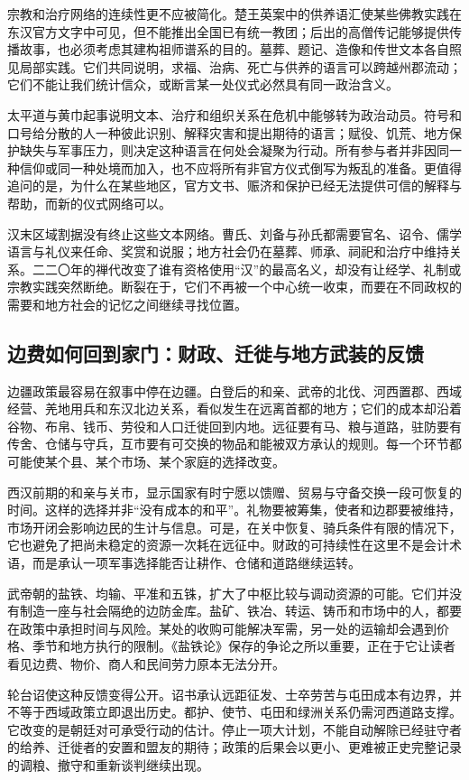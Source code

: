 宗教和治疗网络的连续性更不应被简化。楚王英案中的供养语汇使某些佛教实践在东汉官方文字中可见，但不能推出全国已有统一教团；后出的高僧传记能够提供传播故事，也必须考虑其建构祖师谱系的目的。墓葬、题记、造像和传世文本各自照见局部实践。它们共同说明，求福、治病、死亡与供养的语言可以跨越州郡流动；它们不能让我们统计信众，或断言某一处仪式必然具有同一政治含义。

太平道与黄巾起事说明文本、治疗和组织关系在危机中能够转为政治动员。符号和口号给分散的人一种彼此识别、解释灾害和提出期待的语言；赋役、饥荒、地方保护缺失与军事压力，则决定这种语言在何处会凝聚为行动。所有参与者并非因同一种信仰或同一种处境而加入，也不应将所有非官方仪式倒写为叛乱的准备。更值得追问的是，为什么在某些地区，官方文书、赈济和保护已经无法提供可信的解释与帮助，而新的仪式网络可以。

汉末区域割据没有终止这些文本网络。曹氏、刘备与孙氏都需要官名、诏令、儒学语言与礼仪来任命、奖赏和说服；地方社会仍在墓葬、师承、祠祀和治疗中维持关系。二二〇年的禅代改变了谁有资格使用“汉”的最高名义，却没有让经学、礼制或宗教实践突然断绝。断裂在于，它们不再被一个中心统一收束，而要在不同政权的需要和地方社会的记忆之间继续寻找位置。

\subsection{边费如何回到家门：财政、迁徙与地方武装的反馈}

边疆政策最容易在叙事中停在边疆。白登后的和亲、武帝的北伐、河西置郡、西域经营、羌地用兵和东汉北边关系，看似发生在远离首都的地方；它们的成本却沿着谷物、布帛、钱币、劳役和人口迁徙回到内地。远征要有马、粮与道路，驻防要有传舍、仓储与守兵，互市要有可交换的物品和能被双方承认的规则。每一个环节都可能使某个县、某个市场、某个家庭的选择改变。

西汉前期的和亲与关市，显示国家有时宁愿以馈赠、贸易与守备交换一段可恢复的时间。这样的选择并非“没有成本的和平”。礼物要被筹集，使者和边郡要被维持，市场开闭会影响边民的生计与信息。可是，在关中恢复、骑兵条件有限的情况下，它也避免了把尚未稳定的资源一次耗在远征中。财政的可持续性在这里不是会计术语，而是承认一项军事选择能否让耕作、仓储和道路继续运转。

武帝朝的盐铁、均输、平准和五铢，扩大了中枢比较与调动资源的可能。它们并没有制造一座与社会隔绝的边防金库。盐矿、铁冶、转运、铸币和市场中的人，都要在政策中承担时间与风险。某处的收购可能解决军需，另一处的运输却会遇到价格、季节和地方执行的限制。《盐铁论》保存的争论之所以重要，正在于它让读者看见边费、物价、商人和民间劳力原本无法分开。

轮台诏使这种反馈变得公开。诏书承认远距征发、士卒劳苦与屯田成本有边界，并不等于西域政策立即退出历史。都护、使节、屯田和绿洲关系仍需河西道路支撑。它改变的是朝廷对可承受行动的估计。停止一项大计划，不能自动解除已经驻守者的给养、迁徙者的安置和盟友的期待；政策的后果会以更小、更难被正史完整记录的调粮、撤守和重新谈判继续出现。

